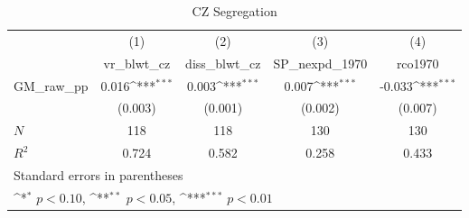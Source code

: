 \begin{table}[htbp]\centering
\def\sym#1{\ifmmode^{#1}\else\(^{#1}\)\fi}
\caption{CZ Segregation}
\begin{tabular}{l*{4}{c}}
\hline\hline
            &\multicolumn{1}{c}{(1)}&\multicolumn{1}{c}{(2)}&\multicolumn{1}{c}{(3)}&\multicolumn{1}{c}{(4)}\\
            &\multicolumn{1}{c}{vr\_blwt\_cz}&\multicolumn{1}{c}{diss\_blwt\_cz}&\multicolumn{1}{c}{SP\_nexpd\_1970}&\multicolumn{1}{c}{rco1970}\\
\hline
GM\_raw\_pp   &       0.016\sym{***}&       0.003\sym{***}&       0.007\sym{***}&      -0.033\sym{***}\\
            &     (0.003)         &     (0.001)         &     (0.002)         &     (0.007)         \\
\hline
\(N\)       &         118         &         118         &         130         &         130         \\
\(R^{2}\)   &       0.724         &       0.582         &       0.258         &       0.433         \\
\hline\hline
\multicolumn{5}{l}{\footnotesize Standard errors in parentheses}\\
\multicolumn{5}{l}{\footnotesize \sym{*} \(p<0.10\), \sym{**} \(p<0.05\), \sym{***} \(p<0.01\)}\\
\end{tabular}
\end{table}

